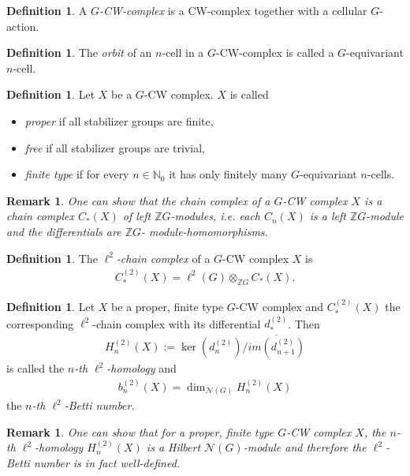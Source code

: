\documentclass[12pt,a4paper]{scrartcl}
\theoremstyle{plain}
\newtheorem{Remark}[Theorem]{Remark}
\theoremstyle{definition}
\newtheorem{Definition}[Theorem]{Definition}
\numberwithin{equation}{section}
\newcommand{\Z}{\mathbb{Z}} %
\newcommand{\N}{\mathbb{N}} %
\newcommand{\2}{\mathbb{Z} / 2 \mathbb{Z}}
\newcommand{\1}{\bar{1}}
\newcommand{\0}{\bar{0}}
\begin{document}
\begin{Definition}
	A \emph{$G$-CW-complex} is a CW-complex together with a cellular $G$-action.
\end{Definition}

\begin{Definition}
	The \emph{orbit} of an $n$-cell in a $G$-CW-complex is called a $G$-equivariant $n$-cell.
\end{Definition}

\begin{Definition}
	Let $X$ be a $G$-CW complex. $X$ is called
	\begin{itemize}
		\item \emph{proper} if all stabilizer groups are finite,
		\item \emph{free} if all stabilizer groups are trivial,
		\item \emph{finite type} if for every $n \in \N_0$ it has only finitely many $G$-equivariant $n$-cells.
	\end{itemize}
\end{Definition}

\begin{Remark}
	One can show that the chain complex of a $G$-CW complex $X$ is a chain complex $C_*(X)$ of left $\Z G$-modules, i.e. each $C_n(X)$ is a left $\Z G$-module and the differentials are $\Z G$- module-homomorphisms.
\end{Remark}
\begin{Definition}
	The \emph{$\ell^2$-chain complex} of a $G$-CW complex $X$ is
	\begin{align*}
		C_*^{(2)}(X) = \ell^2(G) \otimes_{\Z G} C_*(X).
	\end{align*}
\end{Definition}

\begin{Definition}
	Let $X$ be a proper, finite type $G$-CW complex and $C_*^{(2)}(X)$ the corresponding $\ell^2$-chain complex with its differential $d_*^{(2)}$. Then 
	\begin{align*}
		H_n^{(2)}(X) := \ker(d_n^{(2)}) / \overline{im(d_{n+1}^{(2)})}
	\end{align*}
	is called the \emph{$n$-th $\ell^2$-homology} and 
	\begin{align*}
		b_n^{(2)}(X)=\dim_{\mathcal{N}(G)}H_n^{(2)}(X)
	\end{align*}
	the \emph{$n$-th $\ell^2$-Betti number}.
\end{Definition}
\begin{Remark}
	One can show that for a proper, finite type $G$-CW complex $X$, the $n$-th $\ell^2$-homology $H_n^{(2)}(X)$ is a Hilbert $\mathcal{N}(G)$-module and therefore the $\ell^2$-Betti number is in fact well-defined.
\end{Remark}
\end{document}
